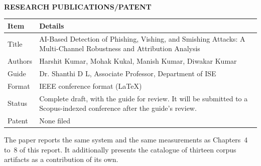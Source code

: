 \chapter*{}                  %
\\[0.3cm]
{\Large\bfseries RESEARCH PUBLICATIONS/PATENT}\\[0.3cm]

\begin{center}
\small{}
\begin{tabular}{|p{3.4cm}|p{10.8cm}|}
\hline
\textbf{Item} & \textbf{Details} \\ \hline
Title & AI-Based Detection of Phishing, Vishing, and Smishing Attacks: A Multi-Channel Robustness and Attribution Analysis \\ \hline
Authors & Harshit Kumar, Mohak Kukal, Manish Kumar, Diwakar Kumar \\ \hline
Guide & Dr. Shanthi D L, Associate Professor, Department of ISE \\ \hline
Format & IEEE conference format (LaTeX) \\ \hline
Status & Complete draft, with the guide for review. It will be submitted to a Scopus-indexed conference after the guide's review. \\ \hline
Patent & None filed \\ \hline
\end{tabular}
\end{center}

The paper reports the same system and the same measurements as Chapters~4 to~8 of this report. It additionally presents the catalogue of thirteen corpus artifacts as a contribution of its own.
